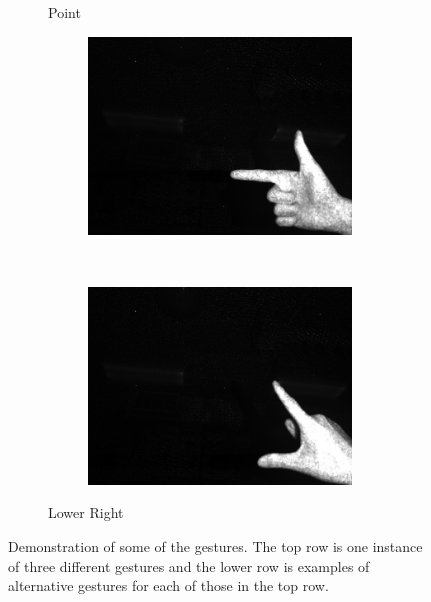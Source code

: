 \begin{figure}
\begin{subfigure}[b]{0.33\columnwidth}
    \caption{Point}
\end{subfigure}%
\begin{subfigure}[b]{0.33\columnwidth}
    \centering
    \begin{subfigure}[b]{\columnwidth}
    \centering
    \includegraphics[width=0.98\columnwidth]{ch5/figs/lower_right_1.png}
    \end{subfigure}
    \\
    \vspace{1pt}
    \begin{subfigure}[b]{\columnwidth}
    \centering
    \includegraphics[width=0.98\columnwidth]{ch5/figs/lower_right_2.png}
    \end{subfigure}
    \caption{Lower Right}
\end{subfigure}
\caption{Demonstration of some of the gestures. The top row is one
instance of three different gestures and the lower row is examples
of alternative gestures for each of those in the top row.}
\label{gesture_data}
\end{figure}
